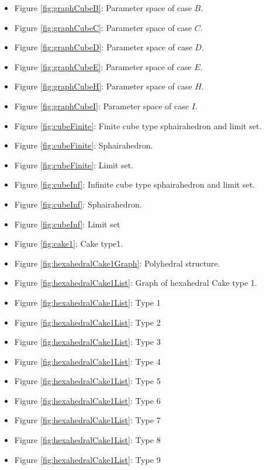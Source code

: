 \documentclass[suppldata, dvipdfmx]{interact}
\theoremstyle{plain}%
\theoremstyle{definition}
\theoremstyle{remark}
\theoremstyle{problemstyle}
\begin{document}
\begin{itemize}
\item Figure \ref{fig:graphCubeB}: Parameter space of case $B$. 
\item Figure \ref{fig:graphCubeC}: Parameter space of case $C$.
\item Figure \ref{fig:graphCubeD}: Parameter space of case $D$.
\item Figure \ref{fig:graphCubeE}: Parameter space of case $E$.
\item Figure \ref{fig:graphCubeH}: Parameter space of case $H$.
\item Figure \ref{fig:graphCubeI}: Parameter space of case $I$.

\item Figure \ref{fig:cubeFinite}: Finite cube type sphairahedron and
      limit set. 
\item Figure \ref{fig:cubeFinite}:
      Sphairahedron.
\item Figure \ref{fig:cubeFinite}: Limit set.

\item Figure \ref{fig:cubeInf}: Infinite cube type sphairahedron and
      limit set.
\item Figure \ref{fig:cubeInf}:
      Sphairahedron.
\item Figure \ref{fig:cubeInf}: Limit
      set

\item Figure \ref{fig:cake1}: Cake type1.
\item Figure \ref{fig:hexahedralCake1Graph}: Polyhedral structure.

\item Figure \ref{fig:hexahedralCake1List}: Graph of hexahedral Cake
      type 1.
\item Figure \ref{fig:hexahedralCake1List}: Type 1
\item Figure \ref{fig:hexahedralCake1List}: Type 2
\item Figure \ref{fig:hexahedralCake1List}: Type 3
\item Figure \ref{fig:hexahedralCake1List}: Type 4
\item Figure \ref{fig:hexahedralCake1List}: Type 5
\item Figure \ref{fig:hexahedralCake1List}: Type 6
\item Figure \ref{fig:hexahedralCake1List}: Type 7
\item Figure \ref{fig:hexahedralCake1List}: Type 8
\item Figure \ref{fig:hexahedralCake1List}: Type 9


\end{itemize}
\end{document}
